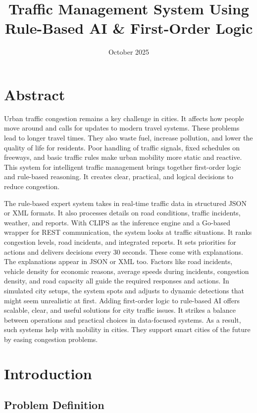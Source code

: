 \documentclass{article}
\title{Traffic Management System Using Rule-Based AI \& First-Order Logic}
\date{October 2025}
\begin{document}
\maketitle

\section*{Abstract}

Urban traffic congestion remains a key challenge in cities. It affects how people move around and calls for updates to modern travel systems. These problems lead to longer travel times. They also waste fuel, increase pollution, and lower the quality of life for residents. Poor handling of traffic signals, fixed schedules on freeways, and basic traffic rules make urban mobility more static and reactive. This system for intelligent traffic management brings together first-order logic and rule-based reasoning. It creates clear, practical, and logical decisions to reduce congestion.

The rule-based expert system takes in real-time traffic data in structured JSON or XML formats. It also processes details on road conditions, traffic incidents, weather, and reports. With CLIPS as the inference engine and a Go-based wrapper for REST communication, the system looks at traffic situations. It ranks congestion levels, road incidents, and integrated reports. It sets priorities for actions and delivers decisions every 30 seconds. These come with explanations. The explanations appear in JSON or XML too. Factors like road incidents, vehicle density for economic reasons, average speeds during incidents, congestion density, and road capacity all guide the required responses and actions. In simulated city setups, the system spots and adjusts to dynamic detections that might seem unrealistic at first. Adding first-order logic to rule-based AI offers scalable, clear, and useful solutions for city traffic issues. It strikes a balance between operations and practical choices in data-focused systems. As a result, such systems help with mobility in cities. They support smart cities of the future by easing congestion problems.

\newpage
\tableofcontents
\newpage

\section{Introduction}

\subsection{Problem Definition}
\end{document}
